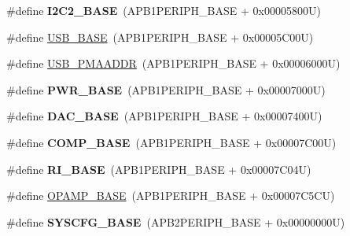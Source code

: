 \begin{DoxyCompactItemize}
\item 
\hypertarget{group___peripheral__memory__map_ga04bda70f25c795fb79f163b633ad4a5d}{\#define {\bfseries I2\-C2\-\_\-\-B\-A\-S\-E}~(A\-P\-B1\-P\-E\-R\-I\-P\-H\-\_\-\-B\-A\-S\-E + 0x00005800\-U)}\label{group___peripheral__memory__map_ga04bda70f25c795fb79f163b633ad4a5d}

\item 
\#define \hyperlink{group___peripheral__memory__map_gaa6c4cbed4ddbb3ecd77de93fab2a2e04}{U\-S\-B\-\_\-\-B\-A\-S\-E}~(A\-P\-B1\-P\-E\-R\-I\-P\-H\-\_\-\-B\-A\-S\-E + 0x00005\-C00\-U)
\item 
\#define \hyperlink{group___peripheral__memory__map_gaf992dfdd5707568c5cb5506e2347e808}{U\-S\-B\-\_\-\-P\-M\-A\-A\-D\-D\-R}~(A\-P\-B1\-P\-E\-R\-I\-P\-H\-\_\-\-B\-A\-S\-E + 0x00006000\-U)
\item 
\hypertarget{group___peripheral__memory__map_gac691ec23dace8b7a649a25acb110217a}{\#define {\bfseries P\-W\-R\-\_\-\-B\-A\-S\-E}~(A\-P\-B1\-P\-E\-R\-I\-P\-H\-\_\-\-B\-A\-S\-E + 0x00007000\-U)}\label{group___peripheral__memory__map_gac691ec23dace8b7a649a25acb110217a}

\item 
\hypertarget{group___peripheral__memory__map_gad18d0b914c7f68cecbee1a2d23a67d38}{\#define {\bfseries D\-A\-C\-\_\-\-B\-A\-S\-E}~(A\-P\-B1\-P\-E\-R\-I\-P\-H\-\_\-\-B\-A\-S\-E + 0x00007400\-U)}\label{group___peripheral__memory__map_gad18d0b914c7f68cecbee1a2d23a67d38}

\item 
\hypertarget{group___peripheral__memory__map_gaa9f5d2999c6918e385d7a526c4f6b1d3}{\#define {\bfseries C\-O\-M\-P\-\_\-\-B\-A\-S\-E}~(A\-P\-B1\-P\-E\-R\-I\-P\-H\-\_\-\-B\-A\-S\-E + 0x00007\-C00\-U)}\label{group___peripheral__memory__map_gaa9f5d2999c6918e385d7a526c4f6b1d3}

\item 
\hypertarget{group___peripheral__memory__map_ga8fdc749e6f184b3cd9b01f179af62e4c}{\#define {\bfseries R\-I\-\_\-\-B\-A\-S\-E}~(A\-P\-B1\-P\-E\-R\-I\-P\-H\-\_\-\-B\-A\-S\-E + 0x00007\-C04\-U)}\label{group___peripheral__memory__map_ga8fdc749e6f184b3cd9b01f179af62e4c}

\item 
\#define \hyperlink{group___peripheral__memory__map_ga6e9722d15c7ed794f0eca9682f64c03c}{O\-P\-A\-M\-P\-\_\-\-B\-A\-S\-E}~(A\-P\-B1\-P\-E\-R\-I\-P\-H\-\_\-\-B\-A\-S\-E + 0x00007\-C5\-C\-U)
\item 
\hypertarget{group___peripheral__memory__map_ga62246020bf3b34b6a4d8d0e84ec79d3d}{\#define {\bfseries S\-Y\-S\-C\-F\-G\-\_\-\-B\-A\-S\-E}~(A\-P\-B2\-P\-E\-R\-I\-P\-H\-\_\-\-B\-A\-S\-E + 0x00000000\-U)}\label{group___peripheral__memory__map_ga62246020bf3b34b6a4d8d0e84ec79d3d}


\end{DoxyCompactItemize}
